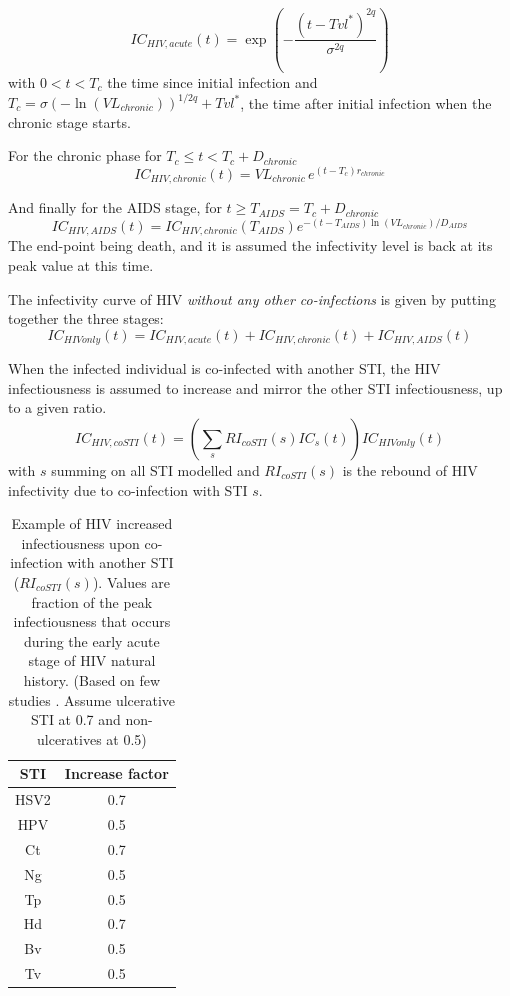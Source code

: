 \documentclass[11pt, onecolumn]{article}
\begin{document}
$$IC_{HIV,acute}(t) = \exp\left( -\frac{(t-Tvl^*)^{2q}}{\sigma^{2q}} \right)$$
with $ 0<t<T_c$ the time since initial infection and $T_c = \sigma (-\ln(VL_{chronic}))^{1/2q} + Tvl^*$, the time after initial infection when the chronic stage starts.

For the chronic phase for $T_c\leq t < T_c+D_{chronic}$
$$ IC_{HIV,chronic}(t) = VL_{chronic} \, e^{(t-T_c)r_{chronic}} $$

And finally for the AIDS stage, for $ t \geq T_{AIDS}= T_c+D_{chronic}$
$$IC_{HIV,AIDS}(t) = IC_{HIV,chronic}(T_{AIDS}) e^{-(t-T_{AIDS}) \ln(VL_{chronic})/D_{AIDS}}$$
The end-point being death, and it is assumed the infectivity level is back at its peak value at this time.

The infectivity curve of HIV \emph{without any other co-infections} is given by putting together the three stages:
$$ IC_{HIVonly}(t) = IC_{HIV,acute}(t)+IC_{HIV,chronic}(t)+IC_{HIV,AIDS}(t)$$

When the infected individual is co-infected with another STI, the HIV infectiousness is assumed to increase and mirror the other STI infectiousness, up to a given ratio.
$$IC_{HIV,coSTI}(t) = \left(\sum_s RI_{coSTI}(s) IC_{s}(t)\right)  IC_{HIVonly}(t) $$
with $s$ summing on all STI modelled and $RI_{coSTI}(s)$ is the rebound of HIV infectivity due to co-infection with STI $s$.

\begin{table}[htdp]
\begin{center}
\begin{tabular}{|c|c|}
\hline
STI & Increase factor \\
\hline
HSV2 & 0.7\\
HPV & 0.5\\
Ct & 0.7\\
Ng & 0.5\\
Tp & 0.5\\
Hd & 0.7\\
Bv & 0.5\\
Tv & 0.5\\
\hline
\end{tabular}
\end{center}
\caption{Example of HIV increased infectiousness upon co-infection with another STI ($RI_{coSTI}(s)$). Values are fraction of the peak infectiousness that occurs during the early acute stage of HIV natural history. (Based on few studies \cite{Cohen:1997kj,Dyer:1998we}. Assume ulcerative STI at 0.7 and non-ulceratives at 0.5)}
\label{Table:rebound}
\end{table}%
\end{document}
